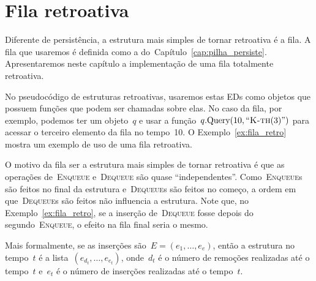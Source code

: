 \documentclass[../../main.tex]{subfiles}
\begin{document}
\chapter{Fila retroativa}

Diferente de persistência, a estrutura mais simples de tornar retroativa é a fila. A fila que usaremos é definida como a do~Capítulo~\ref{cap:pilha_persiste}. Apresentaremos neste capítulo a implementação de uma fila totalmente retroativa.

No pseudocódigo de estruturas retroativas, usaremos estas EDs como objetos que possuem funções que podem ser chamadas sobre elas. No caso da fila, por exemplo, podemos ter um objeto~$q$ e usar a função~$q.\text{Query}(10, ``\textsc{K-th}(3)")$ para acessar o terceiro elemento da fila no tempo~10. O Exemplo~\ref{ex:fila_retro} mostra um exemplo de uso de uma fila retroativa.

O motivo da fila ser a estrutura mais simples de tornar retroativa é que as operações de~\textsc{Enqueue} e~\textsc{Dequeue} são quase ``independentes''. Como~\textsc{Enqueue}s são feitos no final da estrutura e~\textsc{Dequeue}s são feitos no começo, a ordem em que~\textsc{Dequeue}s são feitos não influencia a estrutura. Note que, no Exemplo~\ref{ex:fila_retro}, se a inserção de~\textsc{Dequeue} fosse depois do segundo~\textsc{Enqueue}, o efeito na fila final seria o mesmo.

Mais formalmente, se as inserções são~$E = (e_1, \ldots, e_e)$, então a estrutura no tempo~$t$ é a lista~$(e_{d_t}, \ldots, e_{e_t})$, onde~$d_t$ é o número de remoções realizadas até o tempo~$t$ e~$e_t$ é o número de inserções realizadas até o tempo~$t$.
\end{document}

